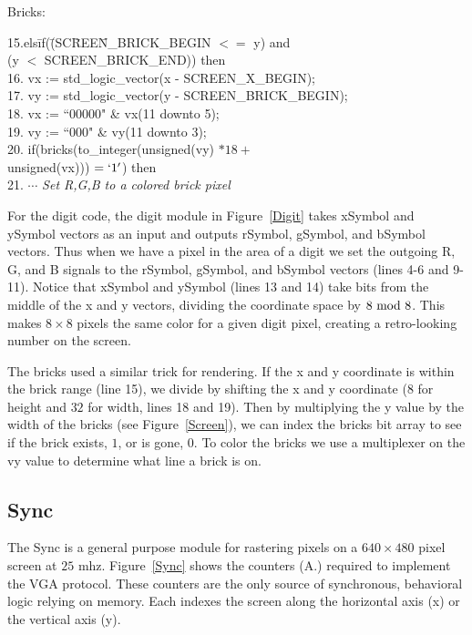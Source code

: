 \documentclass[conference]{IEEEtran}
\begin{document}
Bricks:
\begin{tabbing}
15.els\=if(\=(SC\=REE\=N\_BRICK\_BEGIN $<=$ y) and \\
\>\>(y $<$ SCREEN\_BRICK\_END)) then\\
16.\>	vx := std\_logic\_vector(x - SCREEN\_X\_BEGIN);\\
17.\>	vy := std\_logic\_vector(y - SCREEN\_BRICK\_BEGIN);\\
18.\>	vx := ``00000" \& vx(11 downto 5);\\
19.\>	vy := ``000" \& vy(11 downto 3);\\
20.\>	if(bricks(to\_integer(unsigned(vy) $* 18 +$ \\
\>\>\>unsigned(vx))) $= `1' $) then\\
21.\>\> $\cdots$ \emph{Set R,G,B to a colored brick pixel}\\
\end{tabbing}

For the digit code, the digit module in Figure~\ref{Digit} takes xSymbol and ySymbol vectors as an input and outputs rSymbol, gSymbol, and bSymbol vectors. Thus when we have a pixel in the area of a digit we set the outgoing R, G, and B signals to the rSymbol, gSymbol, and bSymbol vectors (lines 4-6 and 9-11). Notice that xSymbol and ySymbol (lines 13 and 14) take bits from the middle of the x and y vectors, dividing the coordinate space by $8 \hbox{ mod } 8$. This makes $8 \times 8$ pixels the same color for a given digit pixel, creating a retro-looking number on the screen.

The bricks used a similar trick for rendering. If the x and y coordinate is within the brick range (line 15), we divide by shifting the x and y coordinate ($8$ for height and $32$ for width, lines 18 and 19). Then by multiplying the y value by the width of the bricks (see Figure~\ref{Screen}), we can index the bricks bit array to see if the brick exists, $1$, or is gone, $0$. To color the bricks we use a multiplexer on the vy value to determine what line a brick is on.

\subsection{Sync}

The Sync is a general purpose module for rastering pixels on a $640 \times 480$ pixel screen at $25$ mhz. Figure~\ref{Sync} shows the counters (A.) required to implement the VGA protocol. These counters are the only source of synchronous, behavioral logic relying on memory. Each indexes the screen along the horizontal axis (x) or the vertical axis (y).
\end{document}
